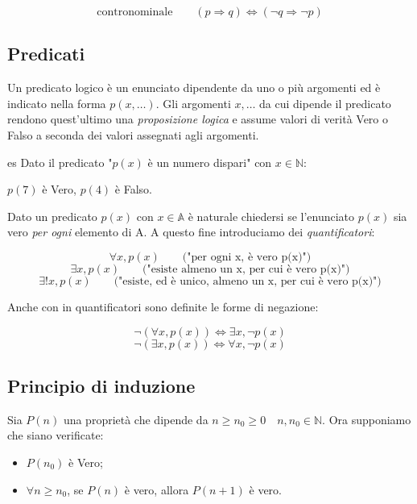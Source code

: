 \documentclass[x11names]{article}
\begin{document}
	\[
	\text{contronominale}\qquad   (p \Rightarrow q) \Longleftrightarrow (\neg q \Rightarrow \neg p)  
	\]
	
	\subsection{Predicati}
	Un predicato logico è un enunciato dipendente da uno o più argomenti ed è indicato nella forma $p(x,\dots)$. Gli argomenti $x,\dots$ da cui dipende il predicato rendono quest'ultimo una \textit{proposizione logica} e assume valori di verità Vero o Falso a seconda dei valori assegnati agli argomenti.
	
	\begin{es}{es}
		Dato il predicato "$p(x)$ è un numero dispari" con $x \in \mathbb{N}$:
		
		$p(7)$ è Vero, $p(4)$ è Falso.
	\end{es}
	
	\vspace{0.7em}
	\noindent
	Dato un predicato $p(x)$ con $x \in \mathbb{A}$ è naturale chiedersi se l'enunciato $p(x)$ sia vero \textit{per ogni} elemento di A. A questo fine introduciamo dei \textit{quantificatori}:
	
	\[
	\forall x, p(x) \qquad \text{("per ogni x, è vero p(x)")}  
	\]
	\[
	\exists x, p(x) \qquad \text{("esiste almeno un x, per cui è vero p(x)")}  
	\]
	\[
	\exists !x, p(x) \qquad \text{("esiste, ed è unico, almeno un x, per cui è vero p(x)")}  
	\]
	
	\vspace{0.7em}
	\noindent
	Anche con in quantificatori sono definite le forme di negazione:
	
	\[
	\neg(\forall x, p(x)) \Longleftrightarrow \exists x, \neg p(x)  
	\]
	\[
	\neg(\exists x, p(x)) \Longleftrightarrow \forall x, \neg p(x)
	\]
	
	\subsection{Principio di induzione}
	Sia $P(n)$ una proprietà che dipende da $n \geq n_0 \geq 0 \quad n,n_0 \in \mathbb{N}$. Ora supponiamo che siano verificate:
	
	\begin{itemize}
		\item $P(n_0)$ è Vero;
		\item $\forall n \geq n_0$, se $P(n)$ è vero, allora $P(n+1)$ è vero.
	\end{itemize}
	
\end{document}
